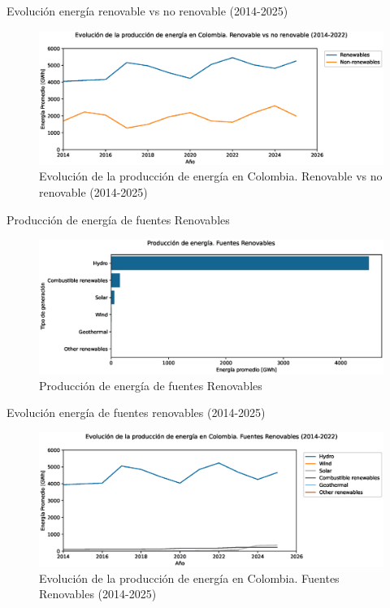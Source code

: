 \documentclass[10pt]{beamer}
\begin{document}
	
\begin{frame}[fragile]{Evolución energía renovable vs no renovable (2014-2025)}
\begin{figure}[t]
		\centering
		\includegraphics[width=0.9\linewidth]{../../reports/fig_11}
		\caption{Evolución de la producción de energía en Colombia. Renovable vs no renovable (2014-2025)}
		\label{fig:fig11}
\end{figure}
\end{frame}
	
\begin{frame}[fragile]{Producción de energía de fuentes Renovables}
\begin{figure}[t]
	\centering
	\includegraphics[width=1\linewidth]{../../reports/fig_12}
	\caption{Producción de energía de fuentes Renovables}
	\label{fig:fig12}
\end{figure}
\end{frame}
	
\begin{frame}[fragile]{Evolución energía de fuentes renovables (2014-2025)}
\begin{figure}[t]
			\centering
			\includegraphics[width=0.9\linewidth]{../../reports/fig_13}
			\caption{Evolución de la producción de energía en Colombia. Fuentes Renovables (2014-2025)}
			\label{fig:fig13}
\end{figure}
\end{frame}
	
\end{document}

